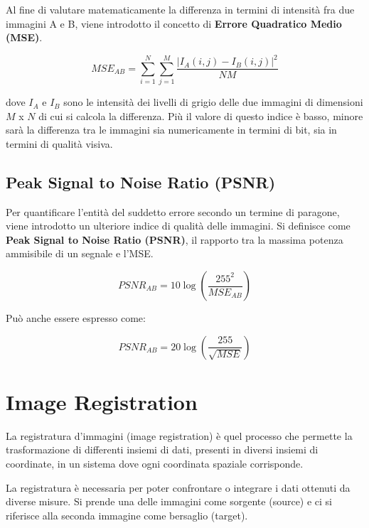 Al fine di valutare matematicamente la differenza in termini di intensità fra due immagini A e B, viene introdotto il concetto di
\textbf{Errore Quadratico Medio (MSE)}.

$$
    MSE_{AB} = \sum_{i=1}^{N}\sum_{j=1}^{M}\frac{|I_A(i,j)-I_B(i,j)|^2}{NM}
$$

dove $I_A$ e $I_B$ sono le intensità dei livelli di grigio delle due immagini di dimensioni $M$ x $N$ di cui si calcola la differenza. Più il valore di questo indice è basso, minore sarà la differenza tra
le immagini sia numericamente in termini di bit, sia in termini di qualità visiva.

\section{Peak Signal to Noise Ratio (PSNR)}

Per quantificare l'entità del suddetto errore secondo un termine di paragone, viene introdotto un ulteriore indice di qualità delle
immagini. Si definisce come \textbf{Peak Signal to Noise Ratio (PSNR)}, il rapporto
tra la massima potenza ammisibile di un segnale e l'MSE.

$$
    PSNR_{AB} = 10 \log(\frac{255^2}{MSE_{AB}})
$$

Può anche essere espresso come:

$$
    PSNR_{AB} = 20 \log(\frac{255}{\sqrt{MSE}})
$$

\chapter{Image Registration}

\begin{definition}
    La registratura d'immagini (image registration) è quel processo che permette la trasformazione di differenti insiemi di dati, presenti in diversi insiemi di coordinate, in un sistema dove ogni coordinata
    spaziale corrisponde.
\end{definition}

La registratura è necessaria per poter confrontare o integrare i dati ottenuti da diverse misure. Si prende una delle immagini come sorgente (source) e ci si
riferisce alla seconda immagine come bersaglio (target).

